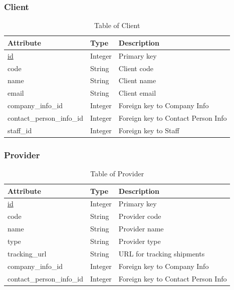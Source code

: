 \subsubsection{Client}
\begin{table}[H]
    \centering
    \begin{tabular}{|p{3cm}|p{2cm}|p{\dimexpr\textwidth-6.8cm}|} %
        \hline
        \rowcolor[HTML]{C0C0C0} 
        \textbf{Attribute} & \textbf{Type} & \textbf{Description} \\ \hline
        \underline{id} & Integer & Primary key \\ \hline
        code & String & Client code \\ \hline
        name & String & Client name \\ \hline
        email & String & Client email \\ \hline
        company\_info\_id & Integer & Foreign key to Company Info \\ \hline
        contact\_person\_info\_id & Integer & Foreign key to Contact Person Info \\ \hline
        staff\_id & Integer & Foreign key to Staff \\ \hline
    \end{tabular}
    \caption{Table of Client}
    \label{tab:client-table}
\end{table}

\subsubsection{Provider}
\begin{table}[H]
    \centering
    \begin{tabular}{|p{3cm}|p{2cm}|p{\dimexpr\textwidth-6.8cm}|} %
        \hline
        \rowcolor[HTML]{C0C0C0} 
        \textbf{Attribute} & \textbf{Type} & \textbf{Description} \\ \hline
        \underline{id} & Integer & Primary key \\ \hline
        code & String & Provider code \\ \hline
        name & String & Provider name \\ \hline
        type & String & Provider type \\ \hline
        tracking\_url & String & URL for tracking shipments \\ \hline
        company\_info\_id & Integer & Foreign key to Company Info \\ \hline
        contact\_person\_info\_id & Integer & Foreign key to Contact Person Info \\ \hline
    \end{tabular}
    \caption{Table of Provider}
    \label{tab:provider-table}
\end{table}


